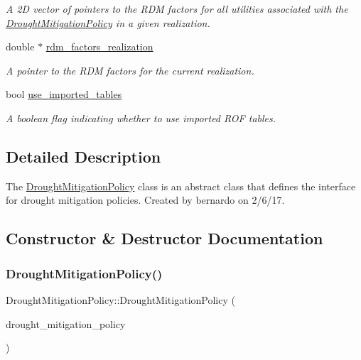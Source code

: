 \begin{DoxyCompactItemize}
\begin{DoxyCompactList}\small\item\em A 2D vector of pointers to the R\+DM factors for all utilities associated with the \mbox{\hyperlink{classDroughtMitigationPolicy}{Drought\+Mitigation\+Policy}} in a given realization. \end{DoxyCompactList}\item 
double $\ast$ \mbox{\hyperlink{classDroughtMitigationPolicy_abef5c917bbc076514fe61bfebbd0e4fc}{rdm\+\_\+factors\+\_\+realization}}
\begin{DoxyCompactList}\small\item\em A pointer to the R\+DM factors for the current realization. \end{DoxyCompactList}\item 
bool \mbox{\hyperlink{classDroughtMitigationPolicy_ace2a2425f6608c34a3189c11445978a1}{use\+\_\+imported\+\_\+tables}}
\begin{DoxyCompactList}\small\item\em A boolean flag indicating whether to use imported R\+OF tables. \end{DoxyCompactList}\end{DoxyCompactItemize}


\subsection{Detailed Description}
The {\ttfamily \mbox{\hyperlink{classDroughtMitigationPolicy}{Drought\+Mitigation\+Policy}}} class is an abstract class that defines the interface for drought mitigation policies. Created by bernardo on 2/6/17. 

\subsection{Constructor \& Destructor Documentation}
\mbox{\label{classDroughtMitigationPolicy_aaf0715876ce33a75c7db92e50523ea0c}} 
\subsubsection{\texorpdfstring{Drought\+Mitigation\+Policy()}{DroughtMitigationPolicy()}\hspace{0.1cm}{\footnotesize\ttfamily [1/2]}}
{\footnotesize\ttfamily Drought\+Mitigation\+Policy\+::\+Drought\+Mitigation\+Policy (\begin{DoxyParamCaption}\item[{const \mbox{\hyperlink{classDroughtMitigationPolicy}{Drought\+Mitigation\+Policy}} \&}]{drought\+\_\+mitigation\+\_\+policy }\end{DoxyParamCaption})\hspace{0.3cm}{\ttfamily [protected]}}



